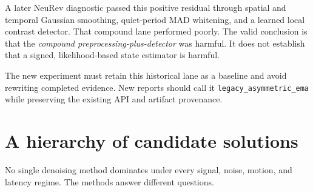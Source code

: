 \documentclass[11pt]{article}
\begin{document}
A later NeuRev diagnostic passed this positive residual through spatial and
temporal Gaussian smoothing, quiet-period MAD whitening, and a learned local
contrast detector. That compound lane performed poorly. The valid conclusion
is that the \emph{compound preprocessing-plus-detector} was harmful. It does not
establish that a signed, likelihood-based state estimator is harmful.

The new experiment must retain this historical lane as a baseline and avoid
rewriting completed evidence. New reports should call it
\texttt{legacy\_asymmetric\_ema} while preserving the existing API and artifact
provenance.

\section{A hierarchy of candidate solutions}

No single denoising method dominates under every signal, noise, motion, and
latency regime. The methods answer different questions.
\end{document}
